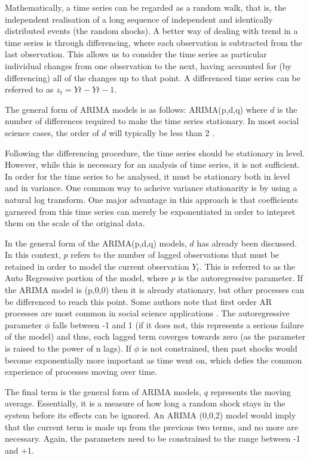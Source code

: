 Mathematically, a time series can be regarded as a random walk, that is, the independent realisation of a long sequence of independent and identically distributed events (the random shocks)\cite{venables2002modern}. A better way of dealing with trend in a time series is through differencing, where each observation is subtracted from the last observation. This allows us to consider the time series as particular individual changes from one observation to the next, having accounted for (by differencing) all of the changes up to that point. A differenced time series can be referred to as $z_t=Yt-Yt-1$. 

The general form of ARIMA models is as follows: ARIMA(p,d,q) where $d$ is the number of differences required to make the time series stationary. In most social science cases, the order of $d$ will typically be less than 2 \cite{mccleary1980applied}. 

Following the differencing procedure, the time series should be stationary in level. However, while this is necessary for an analysis of time series, it is not sufficient. In order for the time series to be analysed, it must be stationary both in level and in variance. One common way to acheive variance stationarity is by using a natural log transform. One major advantage in this approach is that coefficients garnered from this time series can merely be exponentiated in order to intepret them on the scale of the original data. 

In the general form of the ARIMA(p,d,q) models, $d$ has already been discussed. In this context, $p$ refers to the number of lagged observations that must be retained in order to model the current observation $Y_t$. This is referred to as the Auto Regressive portion of the model, where $p$ is the autoregressive parameter. If the ARIMA model is (p,0,0) then it is already stationary, but other processes can be differenced to reach this point. Some authors note that first order AR processes are most common in social science applications \cite{mccleary1980applied}. The autoregressive parameter $\phi$ falls between -1 and 1 (if it does not, this represents a serious failure of the model) and thus, each lagged term coverges towards zero (as the parameter is raised to the power of n lags). 
If $\phi$ is not constrained, then past shocks would become exponentially more important as time went on, which defies the common experience of processes moving over time. 

The final term is the general form of ARIMA models, $q$ represents the moving average. Essentially, it is a measure of how long a random shock stays in the system before its effects can be ignored. An ARIMA (0,0,2) model would imply that the current term is made up from the previous two terms, and no more are necessary. Again, the parameters need to be constrained to the range between -1 and +1.

